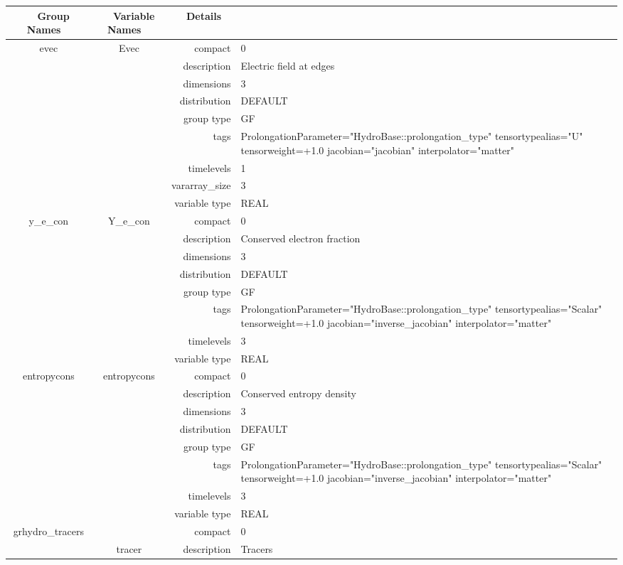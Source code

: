 \documentclass{article}
\begin{document}
\begin{tabular*}{150mm}{|c|c@{\extracolsep{\fill}}|rl|} \hline 
~ {\bf Group Names} ~ & ~ {\bf Variable Names} ~  &{\bf Details} ~ & ~ \\ 
\hline 
evec & Evec & compact & 0 \\ 
 &  & description & Electric field at edges \\ 
 &  & dimensions & 3 \\ 
 &  & distribution & DEFAULT \\ 
 &  & group type & GF \\ 
 &  & tags & ProlongationParameter="HydroBase::prolongation\_type" tensortypealias="U" tensorweight=+1.0 jacobian="jacobian" interpolator="matter" \\ 
 &  & timelevels & 1 \\ 
 &  & vararray\_size & 3 \\ 
 &  & variable type & REAL \\ 
\hline 
y\_e\_con & Y\_e\_con & compact & 0 \\ 
 &  & description & Conserved electron fraction \\ 
 &  & dimensions & 3 \\ 
 &  & distribution & DEFAULT \\ 
 &  & group type & GF \\ 
 &  & tags & ProlongationParameter="HydroBase::prolongation\_type" tensortypealias="Scalar" tensorweight=+1.0 jacobian="inverse\_jacobian" interpolator="matter" \\ 
 &  & timelevels & 3 \\ 
 &  & variable type & REAL \\ 
\hline 
entropycons & entropycons & compact & 0 \\ 
 &  & description & Conserved entropy density \\ 
 &  & dimensions & 3 \\ 
 &  & distribution & DEFAULT \\ 
 &  & group type & GF \\ 
 &  & tags & ProlongationParameter="HydroBase::prolongation\_type" tensortypealias="Scalar" tensorweight=+1.0 jacobian="inverse\_jacobian" interpolator="matter" \\ 
 &  & timelevels & 3 \\ 
 &  & variable type & REAL \\ 
\hline 
grhydro\_tracers &  & compact & 0 \\ 
 & tracer & description & Tracers \\ 

\end{tabular*}
\end{document}
